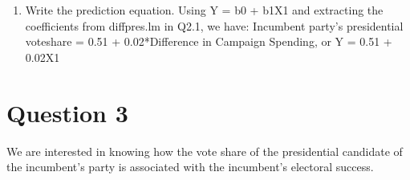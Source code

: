\documentclass[12pt,letterpaper]{article}
\begin{document}
\begin{enumerate}
\begin{figure}[h!]
\end{figure}
		\item Write the prediction equation.
\noindent Using Y = b0 + b1X1 and extracting the coefficients from diffpres.lm in Q2.1, we have: Incumbent party's presidential voteshare = 0.51 + 0.02*Difference in Campaign Spending, or Y = 0.51 + 0.02X1\\
	\end{enumerate}
	
	\newpage	
\section*{Question 3}

\noindent We are interested in knowing how the vote share of the presidential candidate of the incumbent's party is associated with the incumbent's electoral success.\\
	\vspace{.25cm}
\end{document}
